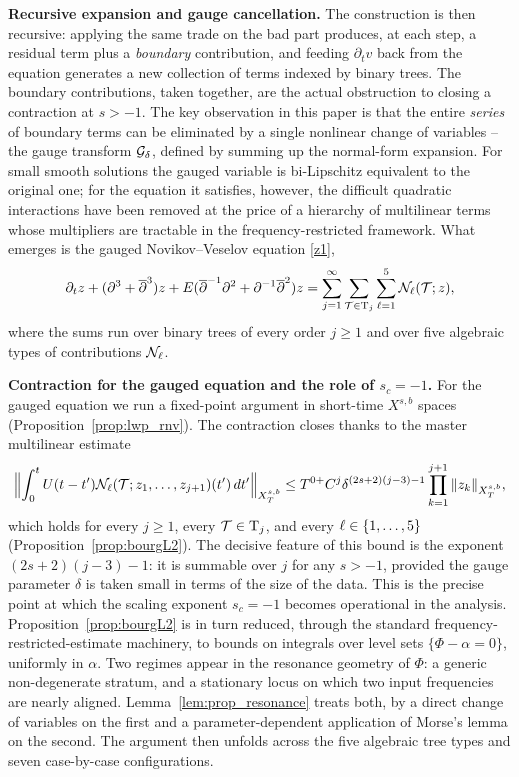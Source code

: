 \medskip

\textbf{Recursive expansion and gauge cancellation.}
The construction is then recursive: applying the same trade on the bad part produces, at each step, a residual term plus a \emph{boundary} contribution, and feeding $\partial_t v$ back from the equation generates a new collection of terms indexed by binary trees. The boundary contributions, taken together, are the actual obstruction to closing a contraction at $s>-1$. The key observation in this paper is that the entire \emph{series} of boundary terms can be eliminated by a single nonlinear change of variables -- the gauge transform $\mathcal{G}_\delta$, defined by summing up the normal-form expansion. For small smooth solutions the gauged variable is bi-Lipschitz equivalent to the original one; for the equation it satisfies, however, the difficult quadratic interactions have been removed at the price of a hierarchy of multilinear terms whose multipliers are tractable in the frequency-restricted framework. What emerges is the gauged Novikov--Veselov equation \eqref{z1},
\[
\partial_t z + (\partial^3+\overline{\partial}^3)z + E(\overline{\partial}^{-1}\partial^2 + \partial^{-1}\overline{\partial}^2)z
= \sum_{j=1}^\infty \sum_{\mathcal{T}\in\mathrm{T}_j}\sum_{\ell=1}^5 \mathcal{N}_\ell(\mathcal{T};z),
\]
where the sums run over binary trees of every order $j\ge1$ and over five algebraic types of contributions $\mathcal{N}_\ell$.

\medskip

\textbf{Contraction for the gauged equation and the role of $s_c=-1$.}
For the gauged equation we run a fixed-point argument in short-time $X^{s,b}$ spaces (Proposition~\ref{prop:lwp_rnv}). The contraction closes thanks to the master multilinear estimate
\[
\Bigl\|\int_0^t U(t-t')\mathcal{N}_\ell(\mathcal{T};z_1,\dots,z_{j+1})(t')\,dt'\Bigr\|_{X^{s,b}_T}
\le T^{0+} C^j \delta^{(2s+2)(j-3)-1}\prod_{k=1}^{j+1}\|z_k\|_{X^{s,b}_T},
\]
which holds for every $j\ge 1$, every $\mathcal{T}\in\mathrm{T}_j$, and every $\ell\in\{1,\dots,5\}$ (Proposition~\ref{prop:bourgL2}). The decisive feature of this bound is the exponent $(2s+2)(j-3)-1$: it is summable over $j$ for any $s>-1$, provided the gauge parameter $\delta$ is taken small in terms of the size of the data. This is the precise point at which the scaling exponent $s_c=-1$ becomes operational in the analysis. Proposition~\ref{prop:bourgL2} is in turn reduced, through the standard frequency-restricted-estimate machinery, to bounds on integrals over level sets $\{\Phi-\alpha=0\}$, uniformly in $\alpha$. Two regimes appear in the resonance geometry of $\Phi$: a generic non-degenerate stratum, and a stationary locus on which two input frequencies are nearly aligned. Lemma~\ref{lem:prop_resonance} treats both, by a direct change of variables on the first and a parameter-dependent application of Morse's lemma on the second. The argument then unfolds across the five algebraic tree types and seven case-by-case configurations.

